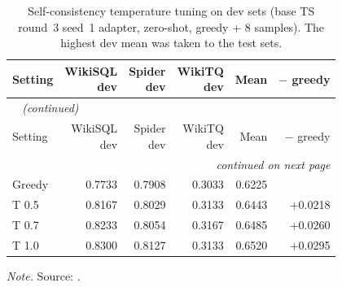 {\small
{}
\setlength{\tabcolsep}{4.2pt}
\begin{longtable}{@{}lrrrrr@{}}
\caption{Self-consistency temperature tuning on dev sets (base TS round~3 seed~1 adapter, zero-shot, greedy + 8 samples). The highest dev mean was taken to the test sets.}\label{tab:gen-sc-dev}\\
\toprule
\rowcolor{headshade}Setting & \makecell{WikiSQL\\dev} & \makecell{Spider\\dev} & \makecell{WikiTQ\\dev} & Mean & $-$ greedy\\
\midrule
\endfirsthead
\multicolumn{6}{l}{\textit{\tablename~\thetable{} (continued)}}\\
\toprule
\rowcolor{headshade}Setting & \makecell{WikiSQL\\dev} & \makecell{Spider\\dev} & \makecell{WikiTQ\\dev} & Mean & $-$ greedy\\
\midrule
\endhead
\midrule
\multicolumn{6}{r}{\textit{continued on next page}}\\
\endfoot
\bottomrule
\endlastfoot
Greedy & 0.7733 & 0.7908 & 0.3033 & 0.6225 & \\
T 0.5 & 0.8167 & 0.8029 & 0.3133 & 0.6443 & +0.0218\\
T 0.7 & 0.8233 & 0.8054 & 0.3167 & 0.6485 & +0.0260\\
T 1.0 & 0.8300 & 0.8127 & 0.3133 & 0.6520 & +0.0295\\
\end{longtable}
}
\vspace{-0.6\baselineskip}
{\footnotesize\color{slate}\textit{Note.} Source: .\par}
\medskip
